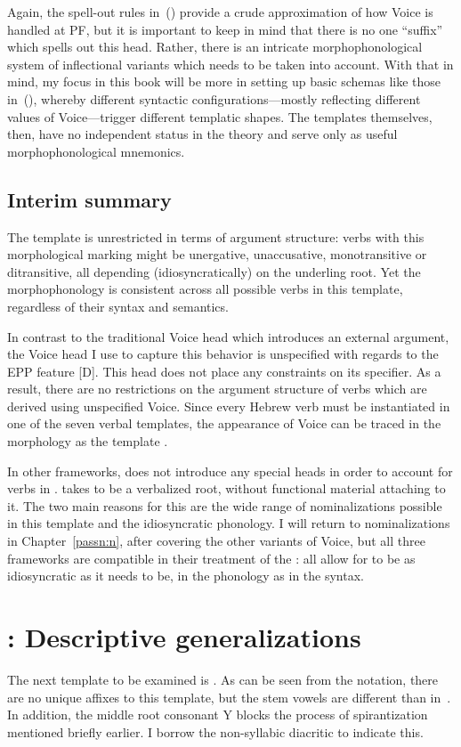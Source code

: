 {Again, the spell-out rules in~(\lastx) provide a crude approximation of how Voice is handled at PF, but it is important to keep in mind that there is no one ``suffix'' {\tkal} which spells out this head. Rather, there is an intricate morphophonological system of inflectional variants which needs to be taken into account. With that in mind, my focus in this book will be more in setting up basic schemas like those in~(\lastx), whereby different syntactic configurations---mostly reflecting different values of Voice---trigger different templatic shapes. The templates themselves, then, have no independent status in the theory and serve only as useful morphophonological mnemonics.

	\subsection{Interim summary}
The template {\tkal} is unrestricted in terms of argument structure: verbs with this morphological marking might be unergative, unaccusative, monotransitive or ditransitive, all depending (idiosyncratically) on the underling root. Yet the morphophonology is consistent across all possible verbs in this template, regardless of their syntax and semantics.

In contrast to the traditional Voice head which introduces an external argument, the Voice head I use to capture this behavior is unspecified with regards to the EPP feature [D]. This head does not place any constraints on its specifier. As a result, there are no restrictions on the argument structure of verbs which are derived using unspecified Voice. Since every Hebrew verb must be instantiated in one of the seven verbal templates, the appearance of Voice can be traced in the morphology as the template {\tkal}.

In other frameworks, \cite{doron03} does not introduce any special heads in order to account for verbs in {\tkal}. \cite{borer13oup,borer15roots} takes {\tkal} to be a verbalized root, without functional material attaching to it. The two main reasons for this are the wide range of nominalizations possible in this template and the idiosyncratic phonology. I will return to nominalizations in Chapter~\ref{passn:n}, after covering the other variants of Voice, but all three frameworks are compatible in their treatment of the {\tkal}: all allow for {\tkal} to be as idiosyncratic as it needs to be, in the phonology as in the syntax.

\section{\tpie: Descriptive generalizations} \label{voice:tpie}
The next template to be examined is {\tpie}. As can be seen from the notation, there are no unique affixes to this template, but the stem vowels are different than in~{\tkal}. In addition, the middle root consonant Y blocks the process of spirantization mentioned briefly earlier. I borrow the non-syllabic diacritic  to indicate this.

}
